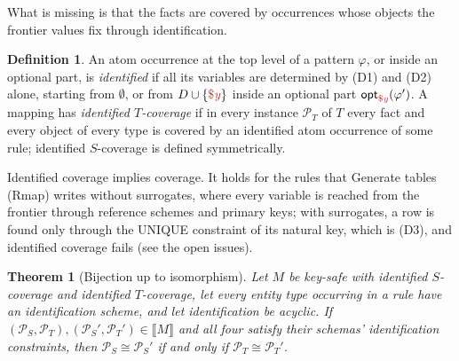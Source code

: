 \documentclass[11pt]{amsart}
\newtheorem{theorem}{Theorem}
\theoremstyle{definition}
\newtheorem{definition}{Definition}
\theoremstyle{remark}
\newcommand{\pop}{\mathcal{P}}
\newcommand{\sem}[1]{\llbracket #1 \rrbracket}
\newcommand{\fv}[1]{\textcolor{BrickRed}{\$\mathit{#1}}}
\newcommand{\Opt}[1]{\mathsf{opt}_{#1}}
\begin{document}
What is missing is that the facts are covered by occurrences whose objects
the frontier values fix through identification.

\begin{definition}
An atom occurrence at the top level of a pattern $\varphi$, or inside an
optional part, is \emph{identified} if all its variables are determined by
(D1) and (D2) alone, starting from $\emptyset$, or from $D \cup \{
\fv{y} \}$ inside an optional part $\Opt{\fv{y}}(\varphi')$. A mapping
has \emph{identified $T$-coverage} if in every instance $\pop_T$ of $T$
every fact and every object of every type is covered by an identified atom
occurrence of some rule; identified $S$-coverage is defined symmetrically.
\end{definition}

Identified coverage implies coverage. It holds for the rules that Generate
tables (Rmap) writes without surrogates, where every variable is reached
from the frontier through reference schemes and primary keys; with
surrogates, a row is found only through the UNIQUE constraint of its
natural key, which is (D3), and identified coverage fails (see the open
issues).

\begin{theorem}[Bijection up to isomorphism]
\label{thm:bijection}
Let $M$ be key-safe with identified $S$-coverage and identified
$T$-coverage, let every entity type occurring in a rule have an
identification scheme, and let identification be acyclic. If $(\pop_S,
\pop_T), (\pop_S', \pop_T') \in \sem{M}$ and all four satisfy their
schemas' identification constraints, then $\pop_S \cong \pop_S'$ if and
only if $\pop_T \cong \pop_T'$.
\end{theorem}
\end{document}
